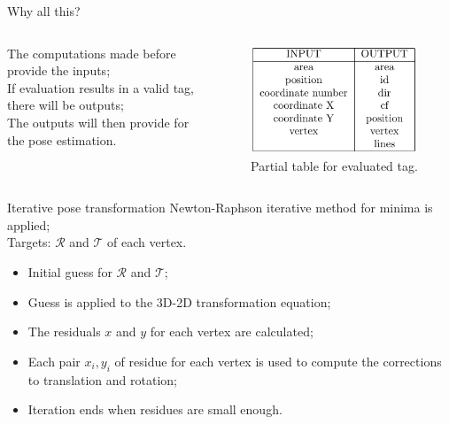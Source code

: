 \documentclass[10pt]{beamer}
\begin{document}
\begin{frame}[fragile]{Why all this?}
  \begin{columns}
      The computations made before provide the inputs;\\
      If evaluation results in a valid tag, there will be outputs;\\
      The outputs will then provide for the pose estimation.
      \begin{figure}
        \centering
        \includegraphics[scale=0.35]{partial-table}
        \caption{Partial table for evaluated tag.}
      \end{figure}
  \end{columns}
\end{frame}


\begin{frame}[fragile]{Iterative pose transformation}
  Newton-Raphson iterative method for minima is applied;\\
  Targets: $\mathcal{R}$ and $\mathcal{T}$ of each vertex.
  \begin{itemize}
    \item Initial guess for $\mathcal{R}$ and $\mathcal{T}$;
    \item Guess is applied to the 3D-2D transformation equation;
    \item The residuals $x$ and $y$ for each vertex are calculated;
    \item Each pair $x_i, y_i$ of residue for each vertex is used to compute the corrections to translation and rotation;
    \item Iteration ends when residues are small enough.
  \end{itemize}
\end{frame}

\end{document}
